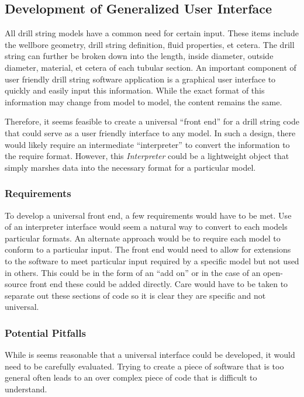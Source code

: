 \subsection{Development of Generalized User Interface}
All drill string models have a common need for certain input.  These items include the wellbore geometry, drill string definition, fluid properties, et cetera.  The drill string can further be broken down into the length, inside diameter, outside diameter, material, et cetera of each tubular section.  An important component of user friendly drill string software application is a graphical user interface to quickly and easily input this information.  While the exact format of this information may change from model to model, the content remains the same.

Therefore, it seems feasible to create a universal ``front end'' for a drill string code that could serve as a user friendly interface to any model.  In such a design, there would likely require an intermediate ``interpreter'' to convert the information to the require format.  However, this \emph{Interpreter} could be a lightweight object that simply marshes data into the necessary format for a particular model.

\subsubsection{Requirements}
To develop a universal front end, a few requirements would have to be met.  Use of an interpreter interface would seem a natural way to convert to each models particular formats.  An alternate approach would be to require each model to conform to a particular input.  The front end would need to allow for extensions to the software to meet particular input required by a specific model but not used in others.  This could be in the form of an ``add on'' or in the case of an open-source front end these could be added directly.  Care would have to be taken to separate out these sections of code so it is clear they are specific and not universal.

\subsubsection{Potential Pitfalls}
While is seems reasonable that a universal interface could be developed, it would need to be carefully evaluated.  Trying to create a piece of software that is too general often leads to an over complex piece of code that is difficult to understand. 